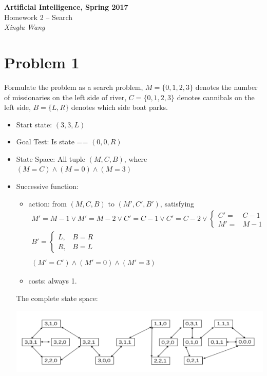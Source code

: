 \documentclass{mcmthesis}
\begin{document}
\begin{center}
	\textbf{\LARGE{Artificial Intelligence, Spring 2017}} \\
	\vspace{0.2em}
	\large{Homework 2 -- Search} \\
	\vspace{1em}
	{\itshape Xinglu Wang}  
\end{center}
\section{Problem 1}
Formulate the problem as a search problem, $M=\{0,1,2,3\}$ denotes the number of missionaries on the left side of river, $C=\{0,1,2,3\}$ denotes cannibals on the left side, $B=\{L,R\}$ denotes which side boat parks.  
\begin{itemize}[noitemsep]
	\item Start state: $\left( 3,3,L \right)$
	\item Goal Test: Is state == $\left(0,0,R\right)$
	\item State Space: All {\color{Blue}{possible}} tuple $(M,C,B)$, where
	$(M=C) \wedge (M=0) \wedge (M=3)$
	\item Successive function: 
	\begin{itemize}[noitemsep]
	\item action: from $(M,C,B)$ to $(M',C',B')$, satisfying
	$$\begin{array}{l}
	M{'}=M-1 \vee M{'} =M-2 \vee C{'}=C-1 \vee C{'}=C-2 \vee 
	\left\lbrace\begin{array}{cc}
	C'= & C-1 \\
	M'= & M-1 
	\end{array} \right. \\
	B{'}= \left\lbrace
	\begin{array}{cc}
	L, & B=R \\
	R, & B=L 
	\end{array}\right.\\ \\
	(M'=C') \wedge (M'=0) \wedge (M'=3)
	\end{array}
	$$
	 \item  costs: always 1.
	\end{itemize}
The complete state space:
\begin{center}
	\includegraphics[width=\columnwidth]{fig1}
\end{center}

\end{itemize}
\end{document}

